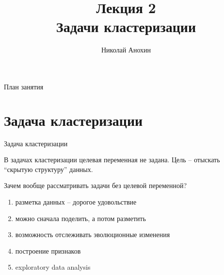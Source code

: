 \documentclass[10pt]{beamer}
\author{Николай Анохин}
\title{\newline \newline \newline Лекция 2 \\ Задачи кластеризации}
\let\otp\titlepage
\renewcommand{\titlepage}{\otp\addtocounter{framenumber}{-1}}
\begin{document}

\begin{frame}[plain]
\titlepage
\end{frame}

\begin{frame}{План занятия}
\tableofcontents
\end{frame}

\section{Задача кластеризации}

\begin{frame}{Задача кластеризации}

В задачах кластеризации целевая переменная не задана. Цель -- отыскать ``скрытую структуру'' данных.

\vspace{1em}
Зачем вообще рассматривать задачи без целевой переменной?
\begin{enumerate}
\item разметка данных -- дорогое удовольствие
\item можно сначала поделить, а потом разметить
\item возможность отслеживать эволюционные изменения
\item построение признаков
\item exploratory data analysis
\end{enumerate}

\end{frame}
\end{document}
